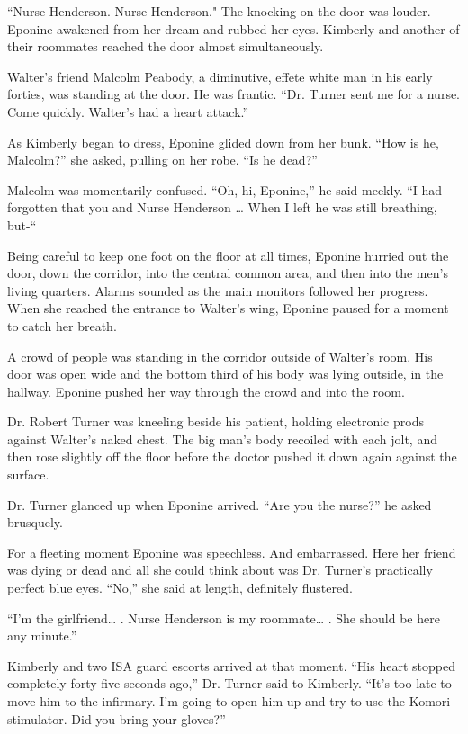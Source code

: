 \documentclass[]{article}
\begin{document}
{“Nurse Henderson.  Nurse Henderson."  The knocking on the door was louder.  Eponine awakened from her dream and rubbed her eyes.  Kimberly and another of their roommates reached the door almost simultaneously.

Walter’s friend Malcolm Peabody, a diminutive, effete white man in his early forties, was standing at the door.  He was frantic.  “Dr.  Turner sent me for a nurse.  Come quickly.  Walter’s had a heart attack.”

As Kimberly began to dress, Eponine glided down from her bunk.  “How is he, Malcolm?” she asked, pulling on her robe.  “Is he dead?”

Malcolm was momentarily confused.  “Oh, hi, Eponine,” he said meekly.  “I had forgotten that you and Nurse Henderson … When I left he was still breathing, but-“

Being careful to keep one foot on the floor at all times, Eponine hurried out the door, down the corridor, into the central common area, and then into the men’s living quarters.  Alarms sounded as the main monitors followed her progress.  When she reached the entrance to Walter’s wing, Eponine paused for a moment to catch her breath.

A crowd of people was standing in the corridor outside of Walter’s room.  His door was open wide and the bottom third of his body was lying outside, in the hallway.  Eponine pushed her way through the crowd and into the room.

Dr.  Robert Turner was kneeling beside his patient, holding electronic prods against Walter’s naked chest.  The big man’s body recoiled with each jolt, and then rose slightly off the floor before the doctor pushed it down again against the surface.

Dr.  Turner glanced up when Eponine arrived.  “Are you the nurse?” he asked brusquely.

For a fleeting moment Eponine was speechless.  And embarrassed.  Here her friend was dying or dead and all she could think about was Dr.  Turner’s practically perfect blue eyes.  “No,” she said at length, definitely flustered.

“I’m the girlfriend… .  Nurse Henderson is my roommate… .  She should be here any minute.”

Kimberly and two ISA guard escorts arrived at that moment.  “His heart stopped completely forty-five seconds ago,” Dr.  Turner said to Kimberly.  “It’s too late to move him to the infirmary.  I’m going to open him up and try to use the Komori stimulator.  Did you bring your gloves?”

}
\end{document}
